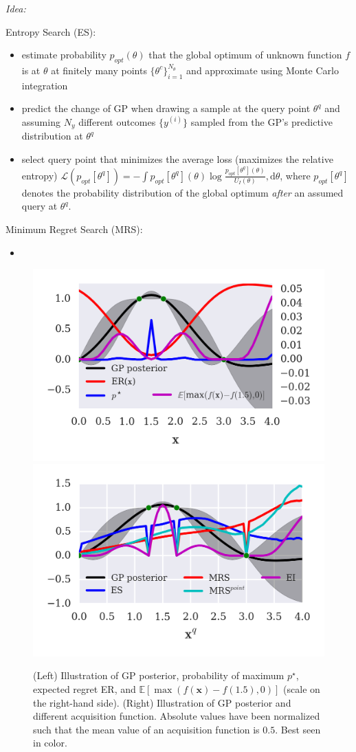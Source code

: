 \begin{block}{}
\emph{Idea:} 

Entropy Search (ES):
\begin{itemize}
 \item estimate probability $p_{opt}(\theta)$ that the global optimum of unknown function $f$ is at $\theta$ at finitely many points $\{\theta^c\}_{i=1}^{N_\theta}$ and approximate using Monte Carlo integration
 \item predict the change of GP when drawing a sample at the query point
$\theta^q$ and assuming $N_y$ different outcomes $\{y^{(i)}\}$ sampled from the
GP's predictive distribution at $\theta^q$
 \item select query point that minimizes the average loss (maximizes the relative entropy) $\mathcal{L}(p_{opt}[\theta^q]) = - \int p_{opt}[\theta^q](\theta) \log \frac{p_{opt}[\theta^q](\theta)}{U_I(\theta)}, \text{d}\theta$,  where $p_{opt}[\theta^q]$ denotes the probability
 distribution of the global optimum \emph{after} an assumed query at $\theta^q$.
\end{itemize}

Minimum Regret Search (MRS):
\begin{itemize}
 \item 
\end{itemize}
\end{block}

\begin{block}{}
\vspace*{1cm}

\begin{figure}
\centering
\includegraphics[width=0.48\columnwidth]{../pics/regret_illustration}
\includegraphics[width=0.48\columnwidth]{../pics/acq_comparison}
\caption{(Left) Illustration of GP posterior, probability of maximum $p^\star$, expected regret ER, and  $\mathbb{E}[\max(f(\mathbf{x}) - f(1.5), 0)]$ (scale on the right-hand side). (Right) Illustration of GP posterior and different acquisition function. Absolute values have been normalized such that the mean value of an acquisition function is $0.5$. Best seen in color.}
\label{fig:MRS_illustration}
\end{figure}
\end{block}

